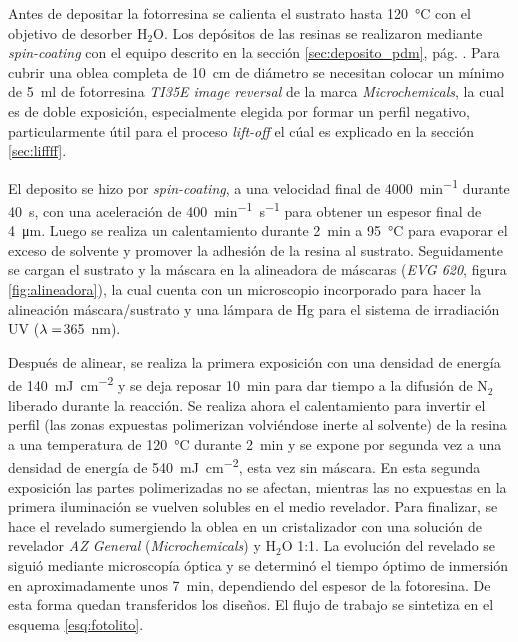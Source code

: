 		Antes de depositar la fotorresina se calienta el sustrato hasta \SI{120}{\celsius} con el objetivo de desorber H$_2$O. Los depósitos de las resinas se realizaron mediante \textit{spin-coating} con el equipo descrito en la sección \ref{sec:deposito_pdm}, pág. \pageref{sec:deposito_pdm}. Para cubrir una oblea completa de \SI{10}{\cm} de diámetro se necesitan colocar un mínimo de \SI{5}{\ml} de fotorresina \textit{TI35E image reversal} de la marca \textit{Microchemicals}, la cual es de doble exposición, especialmente elegida por formar un perfil negativo, particularmente útil para el proceso \textit{lift-off} el cúal es explicado en la sección \ref{sec:liffff}.\cite{MicrochemicalsTeam2009} 
	
		El deposito se hizo por \textit{spin-coating}, a una velocidad final de \SI{4000}{\minute^{-1}} durante \SI{40}{\second}, con una aceleración de \SI{400}{\minute^{-1}.\second^{-1}} para obtener un espesor final de \SI{4}{\um}. Luego se realiza un calentamiento durante \SI{2}{\minute} a \SI{95}{\celsius} para evaporar el exceso de solvente y promover la adhesión de la resina al sustrato. Seguidamente se cargan el sustrato y la máscara en la alineadora de máscaras (\textit{EVG 620}, figura \ref{fig:alineadora}), la cual cuenta con un microscopio incorporado para hacer la alineación máscara/sustrato y una lámpara de Hg para el sistema de irradiación UV ($\lambda\index{longitud de onda}=$\SI{365}{\nm}). 
				
		Después de alinear, se realiza la primera exposición con una densidad de energía de \SI{140}{mJ.\cm^{-2}} y se deja reposar \SI{10}{\minute} para dar tiempo a la difusión de N$_2$ liberado durante la reacción. Se realiza ahora el calentamiento para invertir el perfil (las zonas expuestas polimerizan volviéndose inerte al solvente) de la resina a una temperatura de \SI{120}{\celsius} durante \SI{2}{\minute}  y se expone por segunda vez a una densidad de energía de \SI{540}{mJ.cm^{-2}}, esta vez sin máscara. En esta segunda exposición las partes polimerizadas no se afectan, mientras las no expuestas en la primera iluminación se vuelven solubles en el medio revelador. Para finalizar, se hace el revelado sumergiendo la oblea en un cristalizador con una solución de revelador \textit{AZ General} (\textit{Microchemicals}) y H$_2$O 1:1. La evolución del revelado se siguió mediante microscopía óptica y se determinó el tiempo óptimo de inmersión en aproximadamente unos \SI{7}{\minute}, dependiendo del espesor de la fotoresina. De esta forma quedan transferidos los diseños. El flujo de trabajo se sintetiza en el esquema \ref{esq:fotolito}.
				
